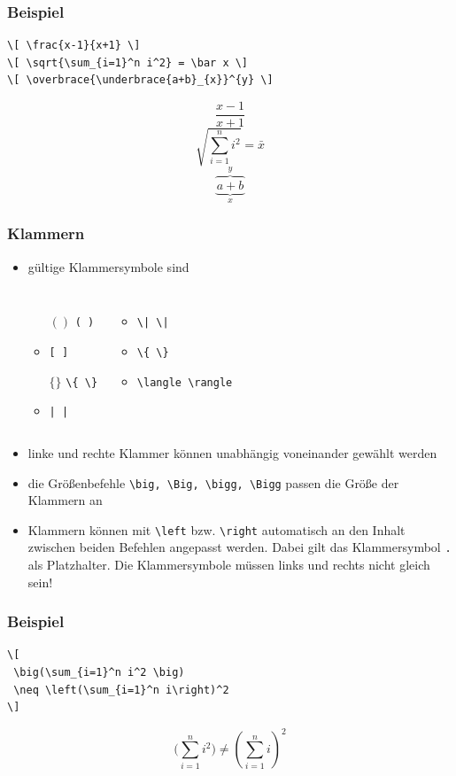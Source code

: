 \begin{frame}[fragile]
\frametitle{Beispiel}
\begin{lstlisting}[style=Latex]
\[ \frac{x-1}{x+1} \]
\[ \sqrt{\sum_{i=1}^n i^2} = \bar x \]
\[ \overbrace{\underbrace{a+b}_{x}}^{y} \]
\end{lstlisting}
\[ \frac{x-1}{x+1} \]
\[ \sqrt{\sum_{i=1}^n i^2} = \bar x \]
\[ \overbrace{\underbrace{a+b}_{x}}^{y} \]
\end{frame}

\begin{frame}[fragile]
\frametitle{Klammern}
\begin{itemize}
  \item<1-> gültige Klammersymbole sind
  \begin{columns}
  \begin{itemize}
    \item[$()$] \lstinline[style=Latex]+( )+ 
    \item[${[]}$] \lstinline[style=Latex]+[ ]+
    \item[$\{\}$] \lstinline[style=Latex]+\{ \}+
    \item[$||$] \lstinline[style=Latex]+| |+
    
  \end{itemize}
  \begin{itemize}
   \item[$\|\|$] \lstinline[style=Latex]+\| \|+
    \item[$\{\}$] \lstinline[style=Latex]+\{ \}+
    \item[$\langle \rangle$] \lstinline[style=Latex]+\langle \rangle+
  \end{itemize}
  \end{columns}
  \item<+-> linke und rechte Klammer können unabhängig voneinander gewählt werden
  \item<+-> die Größenbefehle \lstinline[style=Latex]+\big, \Big, \bigg, \Bigg+ passen die Größe der Klammern an
  \item<+-> Klammern können mit \lstinline[style=Latex]+\left+ bzw. \lstinline[style=Latex]+\right+ automatisch an den Inhalt zwischen beiden Befehlen angepasst werden. Dabei gilt das Klammersymbol \texttt{.} als Platzhalter. Die Klammersymbole müssen links und rechts nicht gleich sein!
\end{itemize}
\end{frame}

\begin{frame}[fragile]
\frametitle{Beispiel}
\begin{lstlisting}[style=Latex]
\[ 
 \big(\sum_{i=1}^n i^2 \big) 
 \neq \left(\sum_{i=1}^n i\right)^2 
\]
\end{lstlisting}
\vspace{1cm}\pause
\[ \big(\sum_{i=1}^n i^2 \big) \neq \left(\sum_{i=1}^n i\right)^2 \]
\end{frame}


